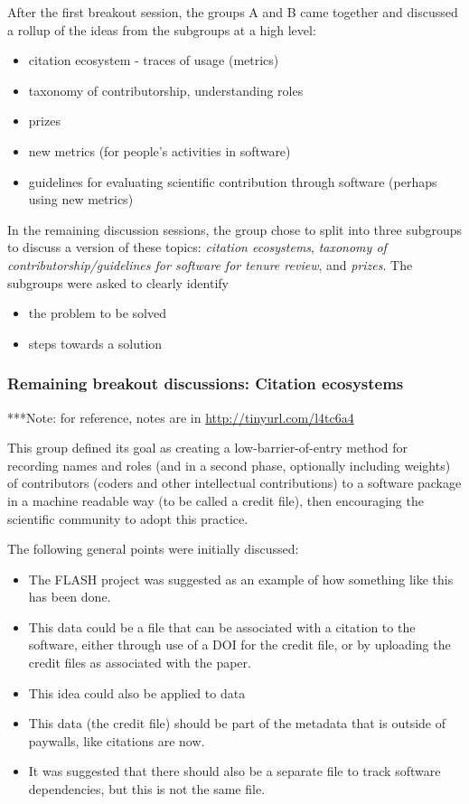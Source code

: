\documentclass[11pt, oneside]{amsart}
\newcommand{\note}[1]{ {\textcolor{blueish}    { ***Note:      #1 }}}
\begin{document}
After the first breakout session, the groups A and B came together and discussed 
a rollup of the ideas from the subgroups at a high level:
\begin{itemize}
\item citation ecosystem - traces of usage (metrics)
\item taxonomy of contributorship, understanding roles
\item prizes
\item new metrics (for people's activities in software)
\item guidelines for evaluating scientific contribution through software (perhaps using new metrics)
\end{itemize}

In the remaining discussion sessions, the group chose to split into three subgroups to discuss
a version of these topics: {\em citation ecosystems},
{\em taxonomy of contributorship/guidelines for software for tenure review}, and {\em prizes}.  The subgroups were asked to clearly identify
\begin{itemize}
\item the problem to be solved
\item steps towards a solution
\end{itemize}



\subsubsection{Remaining breakout discussions: Citation ecosystems}

\note{for reference, notes are in \url{http://tinyurl.com/l4tc6a4}}

This group defined its goal as creating a low-barrier-of-entry method for recording names and roles (and in a second phase, optionally including weights) of contributors (coders and other intellectual contributions) to a software package in a machine readable way (to be called a credit file), then encouraging the scientific community to adopt this practice. 

The following general points were initially discussed: 
\begin{itemize}
\item The FLASH project was suggested as an example of how something like this has been done.
\item This data could be a file that can be associated with a citation to the software, either through use of a DOI for the credit file, or by uploading the credit files as associated with the paper.
\item This idea could also be applied to data
\item This data (the credit file) should be part of the metadata that is outside of paywalls, like citations are now.
\item It was suggested that there should also be a separate file to track software dependencies, but this is not the same file.
\end{itemize} 
\end{document}
